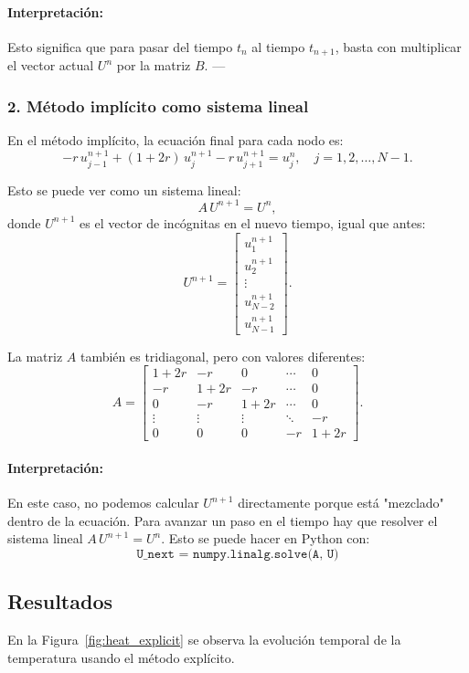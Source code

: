 \documentclass[12pt,a4paper]{article}
\begin{document}
\paragraph{Interpretación:}  
Esto significa que para pasar del tiempo \(t_n\) al tiempo \(t_{n+1}\), basta con multiplicar el vector actual \(U^n\) por la matriz \(B\).  
---

\subsubsection*{2. Método implícito como sistema lineal}

En el método implícito, la ecuación final para cada nodo es:
\[
-r\,u_{j-1}^{n+1} + (1+2r)\,u_j^{n+1} - r\,u_{j+1}^{n+1} = u_j^n,
\quad j = 1, 2, \dots, N-1.
\]

Esto se puede ver como un sistema lineal:
\[
A\,U^{n+1} = U^n,
\]
donde \(U^{n+1}\) es el vector de incógnitas en el nuevo tiempo, igual que antes:
\[
U^{n+1} = 
\begin{bmatrix}
u_1^{n+1} \\ u_2^{n+1} \\ \vdots \\ u_{N-2}^{n+1} \\ u_{N-1}^{n+1}
\end{bmatrix}.
\]

La matriz \(A\) también es tridiagonal, pero con valores diferentes:
\[
A = 
\begin{bmatrix}
1+2r & -r    & 0     & \cdots & 0 \\[4pt]
-r    & 1+2r & -r    & \cdots & 0 \\[4pt]
0     & -r    & 1+2r & \cdots & 0 \\[4pt]
\vdots& \vdots& \vdots& \ddots & -r \\[4pt]
0     & 0     & 0     & -r     & 1+2r
\end{bmatrix}.
\]

\paragraph{Interpretación:}  
En este caso, no podemos calcular \(U^{n+1}\) directamente porque está "mezclado" dentro de la ecuación.  
Para avanzar un paso en el tiempo hay que resolver el sistema lineal \(A\,U^{n+1}=U^n\).  
Esto se puede hacer en Python con:
\[
\texttt{U\_next = numpy.linalg.solve(A, U)}
\]
\subsection{Resultados}
En la Figura~\ref{fig:heat_explicit} se observa la evolución temporal de la temperatura usando el método explícito.
\end{document}
